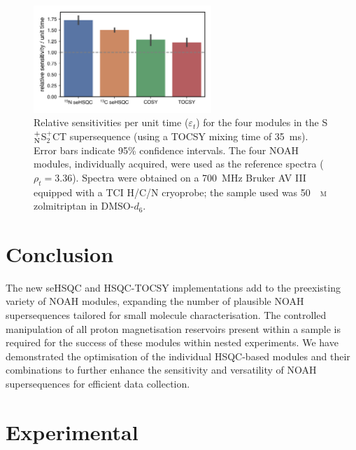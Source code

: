 \documentclass[final,twocolumn]{elsarticle}
\newcommand*{\noahC}{C}
\newcommand*{\noahSpb}{S$^+_2$}
\newcommand*{\noahSpn}{S$\rm ^+_N$}
\newcommand*{\noahT}{T}
\begin{document}
\begin{figure}[!ht]
    \centering
    \includegraphics[width=0.6\textwidth]{FIG6.png}
    \caption{
        Relative sensitivities per unit time ($\varepsilon_t$) for the four modules in the \noahSpn{}\noahSpb{}\noahC{}\noahT{} supersequence (using a TOCSY mixing time of \SI{35}{\ms}).
        Error bars indicate 95\% confidence intervals.
        The four NOAH modules, individually acquired, were used as the reference spectra ($\rho_t = 3.36$).
        Spectra were obtained on a \SI{700}{\MHz} Bruker AV III equipped with a TCI H/C/N cryoprobe; the sample used was \SI{50}{\milli\textsc{m}} zolmitriptan in DMSO-$d_6$.
    }
    \label{fig:snr_modules}
\end{figure}

\section{Conclusion}

The new seHSQC and HSQC-TOCSY implementations add to the preexisting variety of NOAH modules, expanding the number of plausible NOAH supersequences tailored for small molecule characterisation.
The controlled manipulation of all proton magnetisation reservoirs present within a sample is required for the success of these modules within nested experiments.
We have demonstrated the optimisation of the individual HSQC-based modules and their combinations to further enhance the sensitivity and versatility of NOAH supersequences for efficient data collection.

\section*{Experimental}
\end{document}
